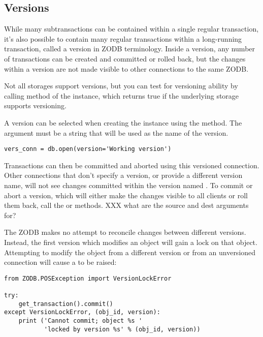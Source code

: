 \subsection{Versions}

While many subtransactions can be contained within a single regular
transaction, it's also possible to contain many regular transactions
within a long-running transaction, called a version in ZODB
terminology.  Inside a version, any number of transactions can be
created and committed or rolled back, but the changes within a version
are not made visible to other connections to the same ZODB.

Not all storages support versions, but you can test for versioning
ability by calling  method of the
 instance, which returns true if the underlying storage
supports versioning.

A version can be selected when creating the 
instance using the  method.
The  argument must be a string that will be used as the
name of the version.

\begin{verbatim}
vers_conn = db.open(version='Working version')
\end{verbatim}

Transactions can then be committed and aborted using this versioned
connection.  Other connections that don't specify a version, or
provide a different version name, will not see changes committed
within the version named .  To commit or abort a
version, which will either make the changes visible to all clients or
roll them back, call the  or
 methods.
XXX what are the source and dest arguments for?

The ZODB makes no attempt to reconcile changes between different
versions.  Instead, the first version which modifies an object will
gain a lock on that object.  Attempting to modify the object from a
different version or from an unversioned connection will cause a
 to be raised:

\begin{verbatim}
from ZODB.POSException import VersionLockError

try:
    get_transaction().commit()
except VersionLockError, (obj_id, version):
    print ('Cannot commit; object %s '
           'locked by version %s' % (obj_id, version))
\end{verbatim}

